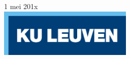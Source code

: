 \begin{titlepage}


{\large 1 mei 201x}\\[2cm] %


\includegraphics[width=2.5in]{logokuleuven.png}\\[1cm] %


\vfill %

\end{titlepage}
